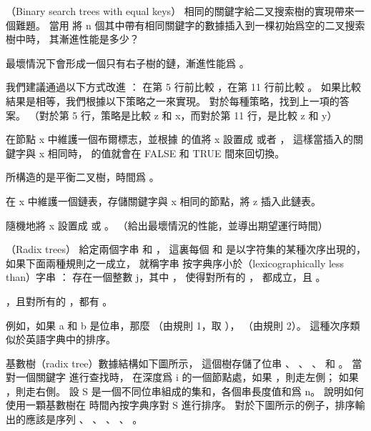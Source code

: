 \startsubject[
  title={Problems},
]

\startPROBLEM
（Binary search trees with equal keys）
相同的關鍵字給二叉搜索樹的實現帶來一個難題。
\startigBase[a]
\startitem
當用  將 n 個其中帶有相同關鍵字的數據插入到一棵初始爲空的二叉搜索樹中時，
其漸進性能是多少？
\stopitem

\startANSWER
最壞情況下會形成一個只有右子樹的鏈，漸進性能爲 。
\stopANSWER

我們建議通過以下方式改進 ：
在第 5 行前比較 ，在第 11 行前比較 。
如果比較結果是相等，我們根據以下策略之一來實現。
對於每種策略，找到上一項的答案。
（對於第 5 行，策略是比較 z 和 x，而對於第 11 行，是比較 z 和 y）

\startitem
在節點 x 中維護一個布爾標志，並根據  的值將 x 設置成  或者 ，
這樣當插入的關鍵字與 x 相同時，  的值就會在 FALSE 和 TRUE 間來回切換。
\stopitem

\startANSWER
所構造的是平衡二叉樹，時間爲 。
\stopANSWER

\startitem
在 x 中維護一個鏈表，存儲關鍵字與 x 相同的節點，將 z 插入此鏈表。
\stopitem

\startitem
隨機地將 x 設置成  或 。
（給出最壞情況的性能，並導出期望運行時間）
\stopitem
\stopigBase
\stopPROBLEM

\startPROBLEM
（Radix trees）
給定兩個字串  和 ，
這裏每個  和  是以字符集的某種次序出現的，
如果下面兩種規則之一成立，
就稱字串  {\EMP 按字典序小於}（lexicographically less than）字串 ：
\startigBase[n]
\startitem
存在一個整數 j，其中 ，
使得對所有的 ，  都成立，且 。
\stopitem

\startitem
{}，且對所有的 ，都有 。
\stopitem
\stopigBase

例如，如果 a 和 b 是位串，那麼  （由規則 1，取 ），
  （由規則 2）。
這種次序類似於英語字典中的排序。

{\EMP 基數樹}（radix tree）數據結構如下圖所示，
這個樹存儲了位串 、 、 、  和 。
當對一個關鍵字  進行查找時，
在深度爲 i 的一個節點處，如果 ，則走左側；
如果 ，則走右側。
設 S 是一個不同位串組成的集和，各個串長度值和爲 n。
說明如何使用一顆基數樹在  時間內按字典序對 S 進行排序。
對於下圖所示的例子，排序輸出的應該是序列 、 、 、 、 。

